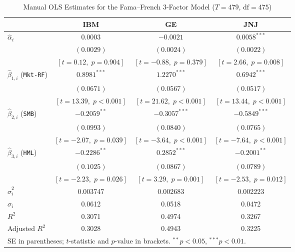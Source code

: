 \documentclass[11pt,a4paper]{article}
\begin{document}
\begin{table}[H]
\centering
\caption{Manual OLS Estimates for the Fama--French 3-Factor Model ($T = 479$, $\text{df} = 475$)}
\label{tab:ols}
\small
\begin{tabular}{lccc}
\toprule
 & IBM & GE & JNJ \\
\midrule
$\hat{\alpha}_i$ & $0.0003$ & $-0.0021$ & $0.0058^{***}$ \\
 & $(0.0029)$ & $(0.0024)$ & $(0.0022)$ \\
 & $[t = 0.12,\; p = 0.904]$ & $[t = -0.88,\; p = 0.379]$ & $[t = 2.66,\; p = 0.008]$ \\[0.5em]
$\hat{\beta}_{1,i}$ (\texttt{Mkt-RF}) & $0.8981^{***}$ & $1.2270^{***}$ & $0.6942^{***}$ \\
 & $(0.0671)$ & $(0.0567)$ & $(0.0517)$ \\
 & $[t = 13.39,\; p < 0.001]$ & $[t = 21.62,\; p < 0.001]$ & $[t = 13.44,\; p < 0.001]$ \\[0.5em]
$\hat{\beta}_{2,i}$ (\texttt{SMB}) & $-0.2059^{**}$ & $-0.3057^{***}$ & $-0.5849^{***}$ \\
 & $(0.0993)$ & $(0.0840)$ & $(0.0765)$ \\
 & $[t = -2.07,\; p = 0.039]$ & $[t = -3.64,\; p < 0.001]$ & $[t = -7.64,\; p < 0.001]$ \\[0.5em]
$\hat{\beta}_{3,i}$ (\texttt{HML}) & $-0.2286^{**}$ & $0.2852^{***}$ & $-0.2001^{**}$ \\
 & $(0.1025)$ & $(0.0867)$ & $(0.0789)$ \\
 & $[t = -2.23,\; p = 0.026]$ & $[t = 3.29,\; p = 0.001]$ & $[t = -2.53,\; p = 0.012]$ \\
\midrule
$\hat{\sigma}_i^2$ & 0.003747 & 0.002683 & 0.002223 \\
$\hat{\sigma}_i$   & 0.0612 & 0.0518 & 0.0472 \\
$R^2$              & 0.3071 & 0.4974 & 0.3267 \\
Adjusted $R^2$     & 0.3028 & 0.4943 & 0.3225 \\
\bottomrule
\multicolumn{4}{l}{\footnotesize SE in parentheses; $t$-statistic and $p$-value in brackets. $^{**}p<0.05$, $^{***}p<0.01$.}
\end{tabular}
\end{table}
\end{document}

